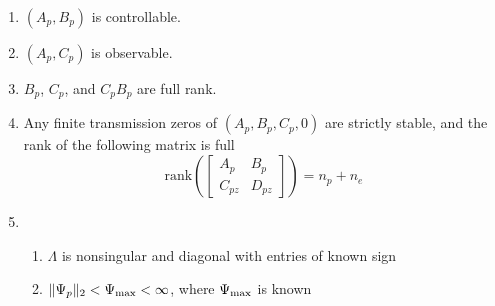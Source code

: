 \begin{customthm}{1} $\;$\label{ass.plant}
  \begin{enumerate}[\Alph{enumi}), ref=\Alph{enumi}] %
    \itemsep0em
    \item{$(A_{p},B_{p})$ is controllable.\label{ass.p.cont}}
    \item{$(A_{p},C_{p})$ is observable.\label{ass.p.obsv}}
    \item{$B_{p}$, $C_{p}$, and $C_{p}B_{p}$ are full rank.\label{ass.p.rank}}
    \item{Any finite transmission zeros of $(A_{p},B_{p},C_{p},0)$ are strictly stable, and the rank of the following matrix is full\label{ass.p.tzero}}
    \begin{equation*}
      \text{rank}\left(
      \begin{bmatrix}
        A_{p} & B_{p} \\
        C_{pz} & D_{pz}
      \end{bmatrix}\right)
      =n_{p}+n_{e}
    \end{equation*}
    \item{%
      \begin{enumerate}[(\alph{enumii}), ref=\alph{enumii}]
        \item{$\Lambda$ is nonsingular and diagonal with entries of known sign\label{ass.p.unc.lambda}}
        \item{$\|\Psi_{p}\|_{2}<\Psi_{\rm{\max}}<\infty$, where $\Psi_{\rm{\max}}$ is known\label{ass.p.unc.wp}}
      \end{enumerate}\label{ass.p.unc}
    }
  \end{enumerate}
\end{customthm}

